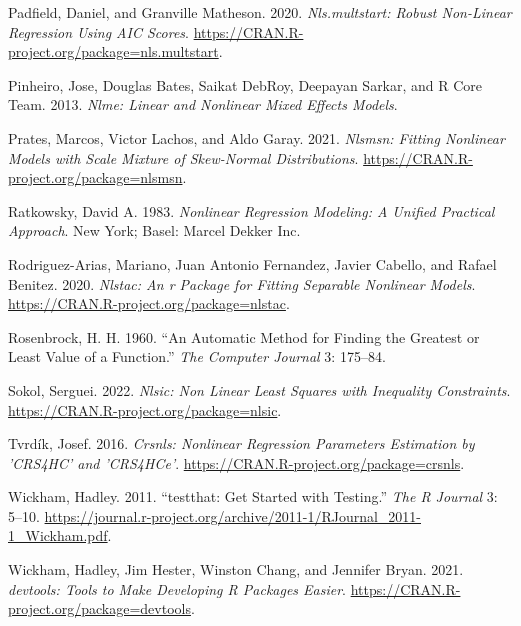 \begin{CSLReferences}{1}{0}
\leavevmode{}%
Padfield, Daniel, and Granville Matheson. 2020. \emph{Nls.multstart: Robust Non-Linear Regression Using AIC Scores}. \url{https://CRAN.R-project.org/package=nls.multstart}.

\leavevmode{}%
Pinheiro, Jose, Douglas Bates, Saikat DebRoy, Deepayan Sarkar, and R Core Team. 2013. \emph{Nlme: Linear and Nonlinear Mixed Effects Models}.

\leavevmode{}%
Prates, Marcos, Victor Lachos, and Aldo Garay. 2021. \emph{Nlsmsn: Fitting Nonlinear Models with Scale Mixture of Skew-Normal Distributions}. \url{https://CRAN.R-project.org/package=nlsmsn}.

\leavevmode{}%
Ratkowsky, David A. 1983. \emph{Nonlinear Regression Modeling: A Unified Practical Approach}. New York; Basel: Marcel Dekker Inc.

\leavevmode{}%
Rodriguez-Arias, Mariano, Juan Antonio Fernandez, Javier Cabello, and Rafael Benitez. 2020. \emph{Nlstac: An r Package for Fitting Separable Nonlinear Models}. \url{https://CRAN.R-project.org/package=nlstac}.

\leavevmode{}%
Rosenbrock, H. H. 1960. {``An Automatic Method for Finding the Greatest or Least Value of a Function.''} \emph{The Computer Journal} 3: 175--84.

\leavevmode{}%
Sokol, Serguei. 2022. \emph{Nlsic: Non Linear Least Squares with Inequality Constraints}. \url{https://CRAN.R-project.org/package=nlsic}.

\leavevmode{}%
Tvrdík, Josef. 2016. \emph{Crsnls: Nonlinear Regression Parameters Estimation by 'CRS4HC' and 'CRS4HCe'}. \url{https://CRAN.R-project.org/package=crsnls}.

\leavevmode{}%
Wickham, Hadley. 2011. {``{testthat: Get Started with Testing}.''} \emph{The R Journal} 3: 5--10. \url{https://journal.r-project.org/archive/2011-1/RJournal_2011-1_Wickham.pdf}.

\leavevmode{}%
Wickham, Hadley, Jim Hester, Winston Chang, and Jennifer Bryan. 2021. \emph{{devtools: Tools to Make Developing R Packages Easier}}. \url{https://CRAN.R-project.org/package=devtools}.

\end{CSLReferences}

